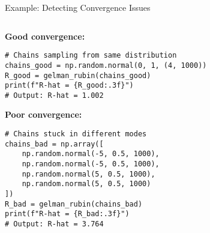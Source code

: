 \documentclass[aspectratio=169]{beamer}
\begin{document}
\begin{frame}[fragile]{Example: Detecting Convergence Issues}
    \begin{columns}
        \begin{column}{0.5\textwidth}
            \textbf{Good convergence:}
            \begin{lstlisting}[basicstyle=\tiny\ttfamily]
# Chains sampling from same distribution
chains_good = np.random.normal(0, 1, (4, 1000))
R_good = gelman_rubin(chains_good)
print(f"R-hat = {R_good:.3f}")
# Output: R-hat = 1.002
            \end{lstlisting}
            
            \vspace{0.5cm}
            \textbf{Poor convergence:}
            \begin{lstlisting}[basicstyle=\tiny\ttfamily]
# Chains stuck in different modes
chains_bad = np.array([
    np.random.normal(-5, 0.5, 1000),
    np.random.normal(-5, 0.5, 1000),
    np.random.normal(5, 0.5, 1000),
    np.random.normal(5, 0.5, 1000)
])
R_bad = gelman_rubin(chains_bad)
print(f"R-hat = {R_bad:.3f}")
# Output: R-hat = 3.764
            \end{lstlisting}
        \end{column}
        \begin{column}{0.5\textwidth}
            \begin{center}
            \end{center}
        \end{column}
    \end{columns}
\end{frame}
\end{document}
